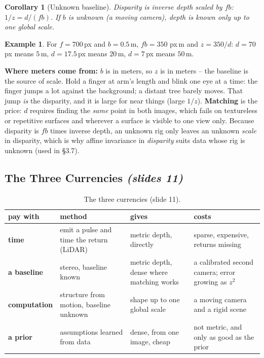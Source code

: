 \documentclass[11pt,a4paper]{article}
\numberwithin{equation}{section}
\newcommand{\slides}[1]{\texorpdfstring{\;\emph{(slides #1)}}{ (slides #1)}}
\theoremstyle{plain}
\newtheorem{corollary}[theorem]{Corollary}
\theoremstyle{definition}
\newtheorem{example}[theorem]{Example}
\begin{document}
\begin{corollary}[Unknown baseline]\label{cor:unknownb}
Disparity is inverse depth scaled by $fb$: $1/z=d/(fb)$. If $b$ is unknown (a moving camera), depth is known only up to one global scale.
\end{corollary}
 
\begin{example}
For $f=700$\,px and $b=0.5$\,m, $fb=350$ px\,m and $z=350/d$: $d=70$\,px means $5$\,m, $d=17.5$\,px means $20$\,m, $d=7$\,px means $50$\,m.
\end{example}
 
\begin{intuition}
\textbf{Where meters come from:} $b$ is in meters, so $z$ is in meters -- the baseline is the source of scale. Hold a finger at arm's length and blink one eye at a time: the finger jumps a lot against the background; a distant tree barely moves. That jump \emph{is} the disparity, and it is large for near things (large $1/z$). \textbf{Matching} is the price: $d$ requires finding the \emph{same} point in both images, which fails on textureless or repetitive surfaces and wherever a surface is visible to one view only. Because disparity is $fb$ times inverse depth, an unknown rig only leaves an unknown \emph{scale} in disparity, which is why affine invariance in \emph{disparity} suits data whose rig is unknown (used in \S3.7).
\end{intuition}
 
\subsection{The Three Currencies \slides{11}}
 
\begin{table}[htbp]
\centering\small
\begin{tabularx}{\linewidth}{@{}p{2.2cm}YYY@{}}
\toprule
pay with & method & gives & costs\\
\midrule
\textbf{time} & emit a pulse and time the return (LiDAR) & metric depth, directly & sparse, expensive, returns missing\\
\textbf{a baseline} & stereo, baseline known & metric depth, dense where matching works & a calibrated second camera; error growing as $z^2$\\
\textbf{computation} & structure from motion, baseline unknown & shape up to one global scale & a moving camera and a rigid scene\\
\textbf{a prior} & assumptions learned from data & dense, from one image, cheap & not metric, and only as good as the prior\\
\bottomrule
\end{tabularx}
\caption{The three currencies (slide 11).}
\end{table}
 
\end{document}
